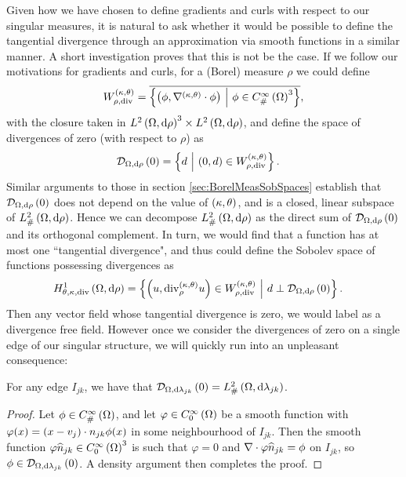Given how we have chosen to define gradients and curls with respect to our singular measures, it is natural to ask whether it would be possible to define the tangential divergence through an approximation via smooth functions in a similar manner.
A short investigation proves that this is not be the case.
If we follow our motivations for gradients and curls, for a (Borel) measure $\rho$ we could define
\begin{align*}
	W_{\rho,\mathrm{div}}^{\left( \kappa, \theta \right)} = \overline{\left\{  \left( \phi,\nabla^{\left( \kappa, \theta \right)}\cdot\phi \right) \ \middle\vert \  \phi\in C^{\infty}_{\#}\left( \Omega \right)^3  \right\}},
\end{align*}
with the closure taken in $L^{2}\left( \Omega,\mathrm{d} \rho \right)^3\times L^{2}\left( \Omega,\mathrm{d} \rho \right)$, and define the space of divergences of zero (with respect to $\rho$) as
\begin{align*}
	\mathcal{D}_{\Omega,\mathrm{d}\rho}\left( 0 \right) &= \left\{ d \ \middle\vert \  \left( 0,d \right)\in W_{\rho,\mathrm{div}}^{\left( \kappa, \theta \right)} \right\}.
\end{align*}
Similar arguments to those in section \ref{sec:BorelMeasSobSpaces} establish that $\mathcal{D}_{\Omega,\mathrm{d}\rho}\left( 0 \right)$ does not depend on the value of $\left( \kappa, \theta \right)$, and is a closed, linear subspace of $L^2_{\#}\left( \Omega,\mathrm{d} \rho \right)$.
Hence we can decompose $L^2_{\#}\left( \Omega,\mathrm{d} \rho \right)$ as the direct sum of $\mathcal{D}_{\Omega,\mathrm{d}\rho}\left( 0 \right)$ and its orthogonal complement.
In turn, we would find that a function has at most one ``tangential divergence", and thus could define the Sobolev space of functions possessing divergences as
\begin{align*}
	H^1_{\theta,\kappa,\mathrm{div}}\left( \Omega,\mathrm{d}\rho \right)
	&= \left\{  \left( u,\mathrm{div}_{\rho}^{\left( \kappa, \theta \right)}u \right)\in W_{\rho,\mathrm{div}}^{\left( \kappa, \theta \right)} \ \middle\vert \  d\perp\mathcal{D}_{\Omega,\mathrm{d}\rho}\left( 0 \right)  \right\}.
\end{align*}
Then any vector field whose tangential divergence is zero, we would label as a divergence free field.
However once we consider the divergences of zero on a single edge of our singular structure, we will quickly run into an unpleasant consequence:
\begin{lemma} \label{lem:DivZero-Everything}
	For any edge $I_{jk}$, we have that $\mathcal{D}_{\Omega,\mathrm{d}\lambda_{jk}}\left( 0 \right)=L^2_{\#}\left( \Omega,\mathrm{d} \lambda_{jk} \right)$.
\end{lemma}
\begin{proof}
	Let $\phi\in C^{\infty}_{\#}\left( \Omega \right)$, and let $\varphi\in C^{\infty}_{0}\left( \Omega \right)$ be a smooth function with $\varphi(x)=\left( x-v_j \right)\cdot n_{jk}\phi(x)$ in some neighbourhood of $I_{jk}$.
	Then the smooth function $\varphi\widehat{n}_{jk}\in C^{\infty}_{0}\left( \Omega \right)^3$ is such that $\varphi=0$ and $\nabla\cdot\varphi\widehat{n}_{jk}=\phi$ on $I_{jk}$, so $\phi\in\mathcal{D}_{\Omega,\mathrm{d}\lambda_{jk}}\left( 0 \right)$.
	A density argument then completes the proof.
\end{proof}
